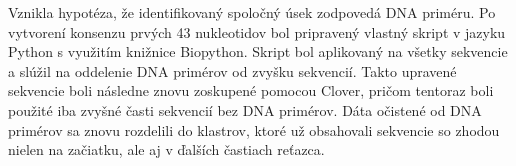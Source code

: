 Vznikla hypotéza, že identifikovaný spoločný úsek zodpovedá DNA priméru. %
Po vytvorení konsenzu prvých 43 nukleotidov bol pripravený vlastný skript v jazyku Python s využitím knižnice Biopython.
Skript bol aplikovaný na všetky sekvencie a slúžil na oddelenie DNA primérov od zvyšku sekvencií.
Takto upravené sekvencie boli následne znovu zoskupené pomocou Clover, pričom tentoraz boli použité iba zvyšné časti sekvencií bez DNA primérov.
Dáta očistené od DNA primérov sa znovu rozdelili do klastrov, ktoré už obsahovali sekvencie so zhodou nielen na začiatku, ale aj v ďalších častiach reťazca.
